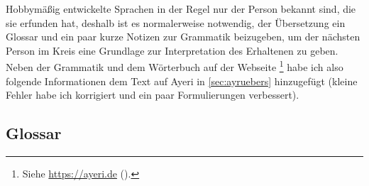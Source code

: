 \documentclass[
	12pt,
	ngerman,
]{scrartcl}
\begin{document}
Hobbymäßig entwickelte Sprachen in der Regel nur der Person bekannt sind, die
sie erfunden hat, deshalb ist es normalerweise notwendig, der Übersetzung ein
Glossar und ein paar kurze Notizen zur Grammatik beizugeben, um der nächsten
Person im Kreis eine Grundlage zur Interpretation des Erhaltenen zu geben.
Neben der Grammatik und dem Wörterbuch auf der Webseite%
%
	\footnote{Siehe \url{https://ayeri.de} ().}
%
habe ich also folgende Informationen dem Text auf Ayeri in \cref{sec:ayruebers}
hinzugefügt (kleine Fehler habe ich korrigiert und ein paar Formulierungen
verbessert).

\subsection{Glossar}

\end{document}
